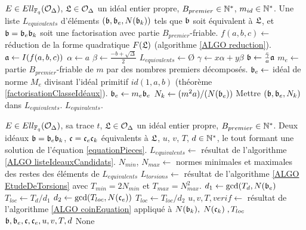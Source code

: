 \begin{algorithm}[H]
	\caption{Liste d'idéaux équivalents candidats}\label{ALGO listeIdeauxCandidats}
	\begin{algorithmic}[1]
		\Require $E\in Ell_{\mathbb{F}_{q}}(\mathcal{O}_{\Delta})$, $\mathfrak{L}\in\mathcal{O}_{\Delta}$ un idéal entier propre, $B_{premier}\in\mathbb{N}^*$, $m_{id}\in\mathbb{N}^*$.
		\Ensure Une liste $L_{equivalents}$ d'éléments $(\mathfrak{b}, \mathfrak{b}_e, N(\mathfrak{b}_k))$ tels que $\mathfrak{b}$ soit équivalent à $\mathfrak{L}$, et $\mathfrak{b} = \mathfrak{b}_e\mathfrak{b}_k$ soit une factorisation avec partie $B_{premier}$-friable. 
		\State$f(a,b,c)\gets$ réduction de la forme quadratique $F(\mathfrak{L})$ (algorithme \ref{ALGO reduction}).
		\State$\mathfrak{a}\gets I(f(a,b,c))$
		\State$\alpha\gets a$
		\State$\beta\gets \frac{-b + \sqrt{\Delta}}{2}$
		\State$L_{equivalents}\gets$\O
		\State $\gamma\gets x\alpha + y\beta$
		\State $\mathfrak{b}\gets \frac{\bar{\gamma}}{a}\mathfrak{a}$
		\State $m_e\gets$ partie $B_{premier}$-friable de $m$ par des nombres premiers décomposés.
		\State $\mathfrak{b}_e\gets$ idéal de norme $M_e$ divisant l'idéal primitif $id(1,a,b)$ (théorème \ref{factorisationClasseIdéaux}).
		\State $\mathfrak{b}_e\gets m_e\mathfrak{b}_e$
		\State $N_k\gets (m^2a)/(N(\mathfrak{b}_e))$
		\State Mettre $(\mathfrak{b}, \mathfrak{b}_e, N_k)$ dans $L_{equivalents}$.
		\EndIf
		\EndIf
		\EndFor
		\EndFor
		\State \Return $L_{equivalents}$.
	\end{algorithmic}
\end{algorithm}


\begin{algorithm}[H]
	\caption{Solution d'équation de normes Clapoti-Pegasis}\label{ALGO solEquation}
	\begin{algorithmic}[1]
		\Require $E\in Ell_{\mathbb{F}_{q}}(\mathcal{O}_{\Delta})$, sa trace $t$, $\mathfrak{L}\in\mathcal{O}_{\Delta}$ un idéal entier propre, $B_{premier}\in\mathbb{N}^*$. 
		\Ensure Deux idéaux $\mathfrak{b} = \mathfrak{b}_e\mathfrak{b}_k$, $\mathfrak{c} = \mathfrak{c}_e\mathfrak{c}_k$ équivalents à $\mathfrak{L}$, $u$, $v$, $T$, $d\in\mathbb{N}^{*}$, le tout formant une solution de l'équation \eqref{equationPieces}.
		\State $L_{equivalents}\gets$ résultat de l'algorithme \ref{ALGO listeIdeauxCandidats}.
		\State $N_{min}$, $N_{max}\gets$ normes minimales et maximales des restes des éléments de $L_{equivalents}$
		\State $L_{torsions}\gets$ résultat de l'algorithme \ref{ALGO EtudeDeTorsions} avec $T_{min} = 2N_{min}$ et $T_{max} = N_{max}^2$.
		\State $d_1\gets\gcd(T_d,N(\mathfrak{b}_e)$
		\State $T_{loc}\gets T_d/d_1$
		\State $d_2\gets\gcd(T_{loc},N(\mathfrak{c}_e))$
		\State $T_{loc}\gets T_{loc}/d_2$
		\State $u, v, T, verif\gets$ résultat de l'algorithme \ref{ALGO coinEquation} appliqué à $N(\mathfrak{b}_k),\; N(\mathfrak{c}_k)\;, T_{loc}$
		\State\Return $\mathfrak{b},\mathfrak{b}_e,\mathfrak{c},\mathfrak{c}_e, u, v, T, d$ 
		\EndIf
		\EndIf
		\EndFor
		\EndFor
		\State \Return None
	\end{algorithmic}
\end{algorithm} 

